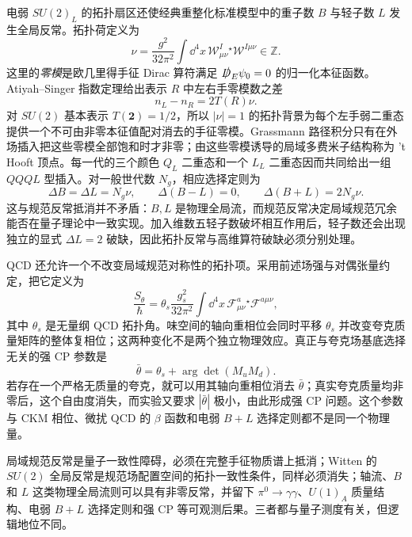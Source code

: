\begin{proposition}
电弱 $SU(2)_L$ 的拓扑扇区还使经典重整化标准模型中的重子数 $B$ 与轻子数 $L$ 发生全局反常。拓扑荷定义为
\begin{equation}
\boxed{
 \nu=\frac{g^2}{32\pi^2}
 \int\dd^4 x\,
 \mathcal W_{\mu\nu}^I{}^\star\!\mathcal W^{I\mu\nu}
 \in\mathbb Z.}
\label{eq:electroweak-topological-charge-dp68}
\end{equation}
这里的\emph{零模}是欧几里得手征 Dirac 算符满足 $\slashed D_E\psi_0=0$ 的归一化本征函数。Atiyah--Singer 指数定理给出表示 $R$ 中左右手零模数之差
\begin{equation*}
 n_L-n_R=2T(R)\nu.
\end{equation*}
对 $SU(2)$ 基本表示 $T(\mathbf2)=1/2$，所以 $|\nu|=1$ 的拓扑背景为每个左手弱二重态提供一个不可由非零本征值配对消去的手征零模。Grassmann 路径积分只有在外场插入把这些零模全部饱和时才非零；由这些零模诱导的局域多费米子结构称为 't Hooft 顶点。每一代的三个颜色 $Q_L$ 二重态和一个 $L_L$ 二重态因而共同给出一组 $QQQL$ 型插入。对一般世代数 $N_g$，相应选择定则为
\begin{equation}
 \boxed{
 \Delta B=\Delta L=N_g\nu,\qquad
 \Delta(B-L)=0,\qquad
 \Delta(B+L)=2N_g\nu.}
 \label{eq:sm-bplusl-selection-dp32}
\end{equation}
这与规范反常抵消并不矛盾：$B,L$ 是物理全局流，而规范反常决定局域规范冗余能否在量子理论中一致实现。加入维数五轻子数破坏相互作用后，轻子数还会出现独立的显式 $\Delta L=2$ 破缺，因此拓扑反常与高维算符破缺必须分别处理。
\end{proposition}

\begin{definition}[与味基无关的强 $CP$ 角]
QCD 还允许一个不改变局域规范对称性的拓扑项。采用前述场强与对偶张量约定，把它定义为
\begin{equation}
 \boxed{
 \frac{S_{\theta}}{\hbar}
 =\theta_s\frac{g_s^2}{32\pi^2}
 \int\dd^4x\,
 \mathcal F_{\mu\nu}^a{}^\star\!\mathcal F^{a\mu\nu},}
 \label{eq:qcd-theta-action-dp89}
\end{equation}
其中 $\theta_s$ 是无量纲 QCD 拓扑角。味空间的轴向重相位会同时平移 $\theta_s$ 并改变夸克质量矩阵的整体复相位；这两种变化不是两个独立物理效应。真正与夸克场基底选择无关的强 CP 参数是
\begin{equation}
 \boxed{
 \bar\theta=\theta_s+\arg\det(M_uM_d).}
 \label{eq:strong-cp-theta-bar-dp11}
\end{equation}
若存在一个严格无质量的夸克，就可以用其轴向重相位消去 $\bar\theta$；真实夸克质量均非零后，这个自由度消失，而实验又要求 $|\bar\theta|$ 极小，由此形成强 CP 问题。这个参数与 CKM 相位、微扰 QCD 的 $\beta$ 函数和电弱 $B+L$ 选择定则都不是同一个物理量。
\end{definition}

局域规范反常是量子一致性障碍，必须在完整手征物质谱上抵消；Witten 的 $SU(2)$ 全局反常是规范场配置空间的拓扑一致性条件，同样必须消失；轴流、$B$ 和 $L$ 这类物理全局流则可以具有非零反常，并留下 $\pi^0\to\gamma\gamma$、$U(1)_A$ 质量结构、电弱 $B+L$ 选择定则和强 CP 等可观测后果。三者都与量子测度有关，但逻辑地位不同。




